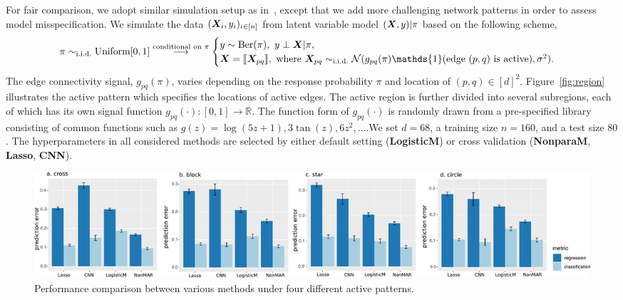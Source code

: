\documentclass[11pt]{article}
\theoremstyle{definition}
\begin{document}
For fair comparison, we adopt similar simulation setup as in~\cite{relion2019network}, except that we add more challenging network patterns in order to assess model misspecification. We simulate the data $(\bm X_i, y_i)_{i\in[n]}$ from latent variable model $(\bm X,y)|\pi$ based on the following scheme,
\[
\pi \sim_{\text{i.i.d.}} \text{Uniform}[0,1] \stackrel{\text{conditional on $\pi$}}{\longrightarrow}
\begin{cases}
y\sim \text{Ber}(\pi),\ \text{}y\perp \mX|\pi, \\
\mX=\entry{\mX_{pq}}, \ \text{where\ } \mX_{pq}\sim_{\text{i.i.d.}} \tN(g_{pq}(\pi)\mathds{1}(\text{edge $(p,q)$ is active}), \sigma^2).
\end{cases}
\]
The edge connectivity signal, $g_{pq}(\pi)$, varies depending on the response probability $\pi$ and location of $(p,q)\in[d]^2$. Figure~\ref{fig:region} illustrates the active pattern which specifies the locations of active edges. The active region is further divided into several subregions, each of which has its own signal function $g_{pq}(\cdot)\colon [0,1]\to \mathbb{R}$. The function form of $g_{pq}(\cdot)$ is randomly drawn from a pre-specified library consisting of common functions such as $g(z)=\log(5z+1), 3\tan(z),6z^2,\ldots$.We set $d=68$, a training size $n=160$, and a test size $80$. The hyperparameters in all considered methods are selected by either default setting ({\bf \small LogisticM}) or cross validation ({\bf \small NonparaM}, {\bf \small Lasso}, {\small \bf CNN}). 


\begin{figure}[ht]
    \centering
    \includegraphics[width=\textwidth]{error_tot_comb2.pdf}
    \caption{Performance comparison between various methods under four different active patterns. }\label{fig:compare}
\end{figure}
\end{document}
